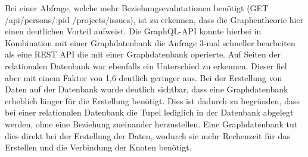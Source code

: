 \newline
\noindent
Bei einer Abfrage, welche mehr Beziehungsevalutationen benötigt  (GET /api/persons/:pid /projects/issues), ist zu erkennen, dass die Graphentheorie hier einen deutlichen Vorteil aufweist. Die GraphQL-API konnte hierbei in Kombination mit einer Graphdatenbank die Anfrage 3-mal schneller bearbeiten als eine REST API die mit einer Graphdatenbank operierte. Auf Seiten der relationalen Datenbank war ebenfalls ein Unterschied zu erkennen. Dieser fiel aber mit einem Faktor von 1,6 deutlich geringer aus.
\newline
\noindent
Bei der Erstellung von Daten auf der Datenbank wurde deutlich sichtbar, dass eine Graphdatenbank erheblich länger für die Erstellung benötigt. Dies ist dadurch zu begründen, dass bei einer relationalen Datenbank die Tupel lediglich in der Datenbank abgelegt werden, ohne eine Beziehung zueinander herzustellen. Eine Graphdatenbank tut dies direkt bei der Erstellung der Daten, wodurch sie mehr Rechenzeit für das Erstellen und die Verbindung der Knoten benötigt. \citep{constantinov2015running}

